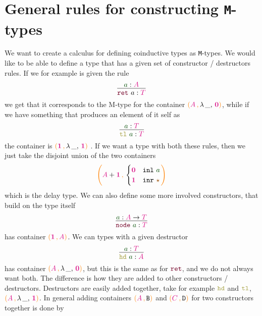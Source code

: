 \documentclass[twoside,11pt,openright]{report}
\theoremstyle{plain} %
\theoremstyle{definition}
\theoremstyle{remark}
\newcommand*{\term}[1]{\textcolor{green!30!black}{#1}} %
\newcommand*{\type}[1]{\textcolor{magenta!90!black}{#1}}
\newcommand*{\containerpair}[2]{\ensuremath{\colorlet{savedleftcolor}{.}\color{orange}\left(\color{savedleftcolor}#1\,\textcolor{orange}{\mathbf{,}}\,#2\color{orange}\right)\color{savedleftcolor}}}
\newcommand*{\containerpairsimple}[2]{\containerpair{#1}{\lambda\,\_,\,#2}}
\newcommand*{\unit}{\type{\textbf{1}}}
\newcommand*{\empt}{\type{\textbf{0}}}
\newcommand*{\constant}[1]{\textcolor{orange!60!black}{\ensuremath{\mathtt{#1}}}}
\newcommand*{\constructor}[1]{\textcolor{purple!60!black}{\ensuremath{\mathtt{#1}}}}
\newcommand*{\destructor}[1]{\textcolor{yellow!60!black}{\ensuremath{\mathtt{#1}}}}
\newcommand*{\typeformer}[1]{\ensuremath{\mathtt{#1}}}
\newcommand*{\unitelem}{\constant{\star}} %
\begin{document}
\section{General rules for constructing \texttt{M}-types}
We want to create a calculus for defining coinductive types as \texttt{M}-types. We would like to be able to define a type that has a given set of constructor / destructors rules. If we for example is given the rule
\begin{equation}
  \vcenter{\infer{\constructor{ret}~a : \type{T}}{\term{a} : \type{A}}}
\end{equation}
we get that it corresponds to the M-type for the container \(\containerpairsimple{\type{A}}{\empt}\), while if we have something that produces an element of it self as
\begin{equation}
  \vcenter{\infer{\destructor{tl}~\term{a} : \type{T}}{\term{a} : \type{T}}}
\end{equation}
the container is \(\containerpairsimple{\unit}{\unit}\) . If we want a type with both these rules, then we just take the disjoint union of the two containers
\begin{equation}
  \containerpair{\type{A} + \unit}{\begin{cases} \empt & \mathtt{inl}~\term{a} \\ \unit & \mathtt{inr}~\unitelem \end{cases}}
\end{equation}
which is the delay type. We can also define some more involved constructors, that build on the type itself
\begin{equation}
  \vcenter{\infer{\constructor{node}~\term{a} : \type{T}}{\term{a} : \type{A} \rightarrow \type{T}}}
\end{equation}
has container \(\containerpair{\unit}{\type{A}}\). We can types with a given destructor
\begin{equation}
  \vcenter{\infer{\destructor{hd}~\term{a} : \type{A}}{\term{a} : \type{T}}}
\end{equation}
has container \(\containerpairsimple{\type{A}}{\empt}\), but this is the same as for \(\constructor{ret}\), and we do not always want both. The difference is how they are added to other constructors / destructors. Destructors are easily added together, take for example \(\destructor{hd}\) and \(\destructor{tl}\), \(\containerpairsimple{\type{A}}{\unit}\). In general adding containers \(\containerpair{\type{A}}{\typeformer{B}}\) and \(\containerpair{\type{C}}{\typeformer{D}}\) for two constructors together is done by
\end{document}
